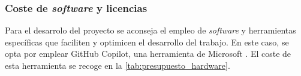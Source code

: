 \documentclass[12pt,a4paper,onecolumn,oneside]{report}
\begin{document}



\subsubsection{Coste de \textit{software} y licencias}
\label{Coste de software y licencias}

Para el desarrolo del proyecto se aconseja el empleo de \textit{software} y herramientas específicas que faciliten
y optimicen el desarrollo del trabajo. En este caso, se opta por emplear GitHub Copilot, una herramienta
de Microsoft \cite{github_copilot}. El coste de esta herramienta se recoge en la \autoref{tab:presupuesto_hardware}.
\end{document}
